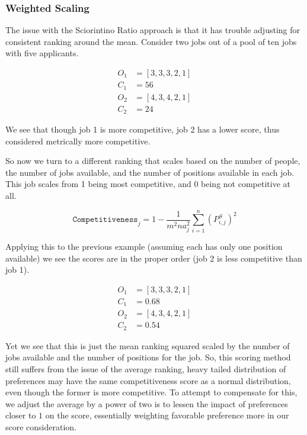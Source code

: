 \subsubsection{Weighted Scaling}

The issue with the Sciorintino Ratio approach is that it has trouble adjusting for consistent ranking around the mean. Consider two jobs out of a pool of ten jobs with five applicants.

\begin{align}
O_1 &= [3,3,3,2,1] \\
C_1 &= 56\\
O_2 &= [4,3,4,2,1] \\
C_2 &= 24
\end{align}

We see that though job 1 is more competitive, job 2 has a lower score, thus considered metrically more competitive.

So now we turn to a different ranking that scales based on the number of people, the number of jobs available, and the number of positions available in each job. This job scales from 1 being most competitive, and 0 being not competitive at all.

\[\texttt{Competitiveness}_j = 1 - \frac{1}{m^2na_j^2} \sum_{i=1}^n (P^S_{i,j})^2\]

Applying this to the previous example (assuming each has only one position available) we see the scores are in the proper order (job 2 is less competitive than job 1).

\begin{align}
O_1 &= [3,3,3,2,1] \\
C_1 &= 0.68\\
O_2 &= [4,3,4,2,1] \\
C_2 &= 0.54
\end{align}

Yet we see that this is just the mean ranking squared scaled by the number of jobs available and the number of positions for the job. So, this scoring method still suffers from the issue of the average ranking, heavy tailed distribution of preferences may have the same competitiveness score as a normal distribution, even though the former is more competitive. To attempt to compensate for this, we adjust the average by a power of two is to lessen the impact of preferences closer to $1$ on the score, essentially weighting favorable preference more in our score consideration.